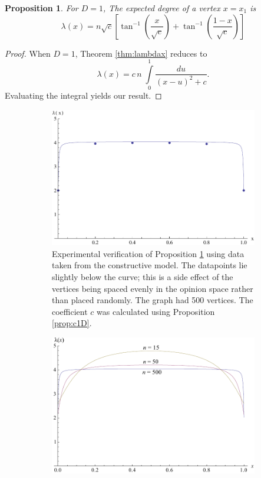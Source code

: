 \documentclass[a4paper,10pt]{article}
\newtheorem{prop}{Proposition}
\begin{document}
\begin{prop}
\label{prop:lambdax1}
For $D = 1$, The expected degree of a vertex $x = x_1$ is
 \begin{equation}
 \lambda(x) = n\sqrt{c}\left[\tan^{-1}\left(\frac{x}{\sqrt{c}}\right)+\tan^{-1}\left(\frac{1-x}{\sqrt{c}}\right)\right]
\end{equation}
\end{prop}
\begin{proof}
When $D=1$, Theorem \ref{thm:lambdax} reduces to
\begin{equation}
 \lambda(x) = c\,n\;\int\limits_{0}^{1} \frac{du}{(x - u)^2 + c}.
\end{equation}
Evaluating the integral yields our result.
\end{proof}

\begin{figure}
 \centering 
 	\begin{subfigure}[h]{1\textwidth}
 		\centering
 		\includegraphics[scale=.85]{images/lambda_verify.pdf}
 		\caption{Experimental verification of Proposition \ref{prop:lambdax1} using data taken from the constructive model. The datapoints lie slightly below the curve; this is a side effect of the vertices being spaced evenly in the opinion space rather than placed randomly. The graph had 500 vertices. The coefficient $c$ was calculated using Proposition \ref{prop:c1D}.}
 	\end{subfigure}
 	\qquad
 	\begin{subfigure}[h]{1\textwidth}
 		\centering
 		\includegraphics[scale=.85]{images/lambda_compare.pdf}

\end{subfigure}
\end{figure}
\end{document}
